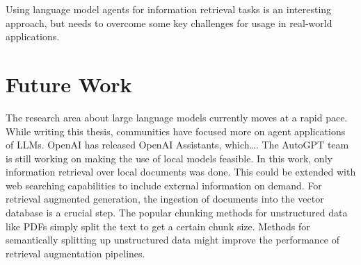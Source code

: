 \documentclass[../main.tex]{subfiles}
\begin{document}
Using language model agents for information retrieval tasks is an interesting approach,
but needs to overcome some key challenges for usage in real-world applications.

\section{Future Work}

The research area about large language models currently moves at a rapid pace.
While writing this thesis, communities have focused more on agent applications of LLMs.
OpenAI has released OpenAI Assistants, which\dots.
The AutoGPT team is still working on making the use of local models feasible.
In this work, only information retrieval over local documents was done.
This could be extended with web searching capabilities to include external information on demand.
For retrieval augmented generation, the ingestion of documents into the vector database is a crucial step.
The popular chunking methods for unstructured data like PDFs simply split the text to get a certain chunk size.
Methods for semantically splitting up unstructured data might improve the performance of retrieval augmentation pipelines.
\end{document}
